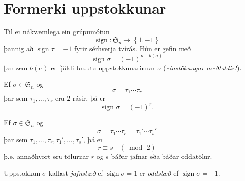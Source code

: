 \documentclass[a4paper,icelandic,11pt]{book}
\theoremstyle{plain}
\DeclareMathOperator{\sign}{sign} %
\begin{document}
\section{Formerki uppstokkunar}
\begin{setn}\label{setn:signum}
  Til er nákvæmlega ein grúpumótun
 \[
 \sign: \mathfrak S_n\to \left\{ 1,-1 \right\}
 \]
 þannig að $\sign\tau = -1$ fyrir sérhverja tvírás. Hún er gefin með
 \[
 \sign\sigma = (-1)^{n-b(\sigma)}
 \]
 þar sem $b(\sigma)$ er fjöldi brauta uppstokkunarinnar $\sigma$
 (\emph{einstökungar meðtaldir!}).
\end{setn}
\begin{fylgisetn}\label{fylgisetn:signum_1}
  Ef $\sigma\in\mathfrak S_n$ og 
 \[
 \sigma = \tau_1\cdots \tau_r
 \]
 þar sem $\tau_1,\dots,\tau_r$ eru $2$-rásir, þá er 
\[
\sign\sigma = \left( -1 \right)^r.
\]
\end{fylgisetn}
\begin{fylgisetn}\label{fylgisetn:signum_2}
  Ef $\sigma\in\mathfrak S_n$ og\[
  \sigma = \tau_1\cdots \tau_r = \tau_1'\cdots \tau_s'
  \]
  þar sem $\tau_1,\dots,\tau_r,\tau_1',\dots,\tau_s'$, þá er
 \[
 r \equiv s \quad (\bmod \,2)
 \]
 þ.e. annaðhvort eru tölurnar $r$ og $s$ báðar jafnar eða báðar oddatölur.
\end{fylgisetn}
\begin{skilgr}
  Uppstokkun $\sigma$ kallast \emph{jafnstæð}
  ef $\sign\sigma = 1$ er \emph{oddstæð}
  ef $\sign\sigma = -1$.
\end{skilgr}
\end{document}
